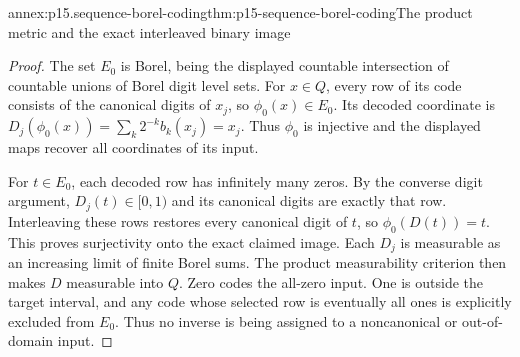 \begin{annexitem}{annex:p15.sequence-borel-coding}{thm:p15-sequence-borel-coding}{The product metric and the exact interleaved binary image}
\begin{proof}
The set \(E_0\) is Borel, being the displayed countable
intersection of countable unions of Borel digit level sets.
For \(x\in Q\), every row of its code consists of the
canonical digits of \(x_j\), so \(\phi_0(x)\in E_0\).
Its decoded coordinate is
\(D_j(\phi_0(x))=\sum_k2^{-k}b_k(x_j)=x_j\).
Thus \(\phi_0\) is injective and the displayed maps recover
all coordinates of its input.

For \(t\in E_0\), each decoded row has infinitely many
zeros. By the converse digit argument, \(D_j(t)\in[0,1)\)
and its canonical digits are exactly that row. Interleaving
these rows restores every canonical digit of \(t\), so
\(\phi_0(D(t))=t\). This proves surjectivity onto the exact
claimed image. Each \(D_j\) is measurable as an increasing
limit of finite Borel sums. The product measurability criterion
then makes \(D\) measurable into \(Q\). Zero codes the
all-zero input. One is outside the target interval, and any
code whose selected row is eventually all ones is explicitly
excluded from \(E_0\). Thus no inverse is being assigned
to a noncanonical or out-of-domain input.
\end{proof}
\end{annexitem}

